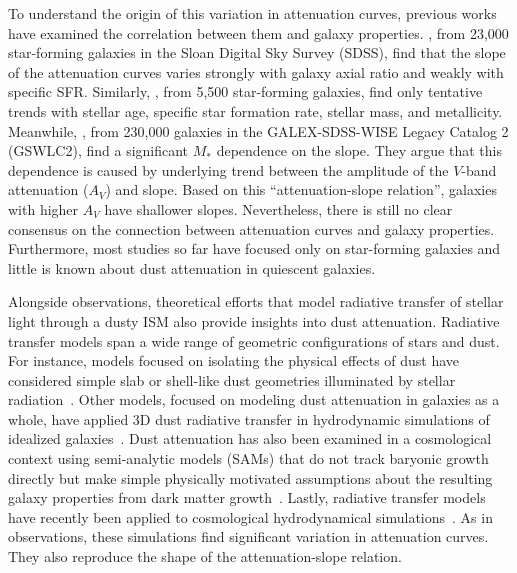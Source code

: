 To understand the origin of this variation in attenuation curves, previous
works have examined the correlation between them and galaxy properties. 
\cite{wild2011}, from 23,000 star-forming galaxies in the Sloan Digital
Sky Survey (SDSS), find that the slope of the attenuation curves varies 
strongly with galaxy axial ratio and weakly with specific SFR. Similarly, 
\cite{battisti2017}, from 5,500 star-forming galaxies, find only tentative
trends with stellar age, specific star formation rate, stellar mass, and
metallicity. Meanwhile, \cite{salim2018}, from 230,000 galaxies in the
GALEX-SDSS-WISE Legacy Catalog 2 (GSWLC2), find a significant $M_*$ 
dependence on the slope. They argue that this dependence is caused by
underlying trend between the amplitude of the $V$-band attenuation ($A_V$) and
slope. Based on this ``attenuation-slope relation'', galaxies with higher $A_V$
have shallower slopes. Nevertheless, there is still no clear consensus on the
connection between attenuation curves and galaxy properties. Furthermore, most
studies so far have focused only on star-forming galaxies and little is known
about dust attenuation in quiescent galaxies.

Alongside observations, theoretical efforts that model radiative transfer of
stellar light through a dusty ISM also provide insights into dust attenuation.
Radiative transfer models span a wide range of geometric configurations of
stars and dust. For instance, models focused on isolating the physical effects
of dust have considered simple slab or shell-like dust geometries illuminated
by stellar radiation~\citep[\eg][]{witt1996, witt2000, seon2016}. Other models,
focused on modeling dust attenuation in galaxies as a whole, have applied 3D
dust radiative transfer in hydrodynamic simulations of idealized
galaxies~\citep[\eg][]{jonsson2006, rocha2008, hayward2015, natale2015,
hou2017}. Dust attenuation has also been examined in a cosmological context
using semi-analytic models (SAMs) that do not track baryonic growth directly 
but make simple physically motivated assumptions about the resulting galaxy
properties from dark matter growth~\citep[\eg][]{granato2000,
fontanot2009, wilkins2012, gonzalez-perez2013}. Lastly, radiative transfer
models have recently been applied to cosmological hydrodynamical
simulations~\cite[\eg]{camps2015, narayanan2018, trayford2020}. As in
observations, these simulations find significant variation in attenuation
curves. They also reproduce the shape of the attenuation-slope relation. 

